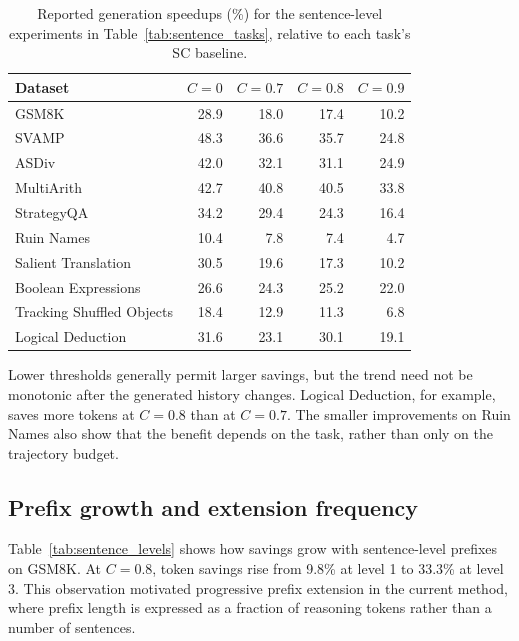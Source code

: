 \begin{table}[!htbp]
\centering\small
\caption{Reported generation speedups (\%) for the sentence-level experiments in Table~\ref{tab:sentence_tasks}, relative to each task's SC baseline.}
\label{tab:sentence_time}
\begin{tabular}{@{}lrrrr@{}}
\toprule
Dataset & $C=0$ & $C=0.7$ & $C=0.8$ & $C=0.9$\\
\midrule
GSM8K & 28.9 & 18.0 & 17.4 & 10.2\\
SVAMP & 48.3 & 36.6 & 35.7 & 24.8\\
ASDiv & 42.0 & 32.1 & 31.1 & 24.9\\
MultiArith & 42.7 & 40.8 & 40.5 & 33.8\\
StrategyQA & 34.2 & 29.4 & 24.3 & 16.4\\
Ruin Names & 10.4 & 7.8 & 7.4 & 4.7\\
Salient Translation & 30.5 & 19.6 & 17.3 & 10.2\\
Boolean Expressions & 26.6 & 24.3 & 25.2 & 22.0\\
Tracking Shuffled Objects & 18.4 & 12.9 & 11.3 & 6.8\\
Logical Deduction & 31.6 & 23.1 & 30.1 & 19.1\\
\bottomrule
\end{tabular}
\end{table}

Lower thresholds generally permit larger savings, but the trend need not be monotonic after the generated history changes. Logical Deduction, for example, saves more tokens at $C=0.8$ than at $C=0.7$. The smaller improvements on Ruin Names also show that the benefit depends on the task, rather than only on the trajectory budget.

\subsection{Prefix growth and extension frequency}
Table~\ref{tab:sentence_levels} shows how savings grow with sentence-level prefixes on GSM8K. At $C=0.8$, token savings rise from 9.8\% at level 1 to 33.3\% at level 3. This observation motivated progressive prefix extension in the current method, where prefix length is expressed as a fraction of reasoning tokens rather than a number of sentences.

